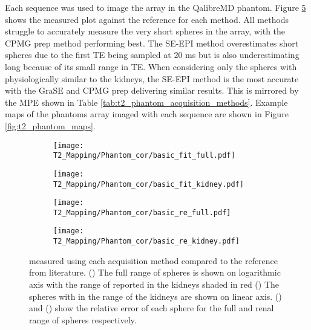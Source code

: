 Each sequence was used to image the \ttwo array in the QalibreMD phantom. Figure \ref{fig:t2_phantom_cor} shows the measured \ttwo plot against the reference \ttwo for each method. All methods struggle to accurately measure the very short \ttwo spheres in the array, with the \ac{CPMG} \ttwo prep method performing best. The \ac{SE}-\ac{EPI} method overestimates short \ttwo spheres due to the first \ac{TE} being sampled at 20 ms but is also underestimating long \ttwo because of its small range in \ac{TE}. When considering only the spheres with physiologically similar \ttwo to the kidneys, the \ac{SE}-\ac{EPI} method is the most accurate with the \ac{GraSE} and \ac{CPMG} \ttwo prep delivering similar results. This is mirrored by the \ac{MPE} shown in Table \ref{tab:t2_phantom_acquisition_methods}. Example \ttwo maps of the phantoms \ttwo array imaged with each sequence are shown in Figure \ref{fig:t2_phantom_maps}.

\begin{figure}[H]
	\centering
	\begin{subfigure}[c]{0.47\textwidth}
		\centering
		\texttt{[image: T2\_Mapping/Phantom\_cor/basic\_fit\_full.pdf]}
		\caption{}
		\label{fig:t2_phantom_cor_full}
	\end{subfigure}
	\hfill
	\begin{subfigure}[c]{0.47\textwidth}
		\centering
		\texttt{[image: T2\_Mapping/Phantom\_cor/basic\_fit\_kidney.pdf]}
		\caption{}
		\label{fig:t2_phantom_cor_kidney}
	\end{subfigure}
	\vfill
		\begin{subfigure}[c]{0.47\textwidth}
		\centering
		\texttt{[image: T2\_Mapping/Phantom\_cor/basic\_re\_full.pdf]}
		\caption{}
		\label{fig:t2_phantom_re_full}
	\end{subfigure}
	\hfill
	\begin{subfigure}[c]{0.47\textwidth}
		\centering
		\texttt{[image: T2\_Mapping/Phantom\_cor/basic\_re\_kidney.pdf]}
		\caption{}
		\label{fig:t2_phantom_re_kidney}
	\end{subfigure}
	\caption{\ttwo measured using each acquisition method compared to the reference \ttwo from literature. () The full range of \ttwo spheres is shown on logarithmic axis with the range of \ttwo reported in the kidneys shaded in red () The spheres with \ttwo in the range of the kidneys are shown on linear axis. () and () show the relative error of each sphere for the full and renal range of spheres respectively.}
	\label{fig:t2_phantom_cor}
\end{figure}

